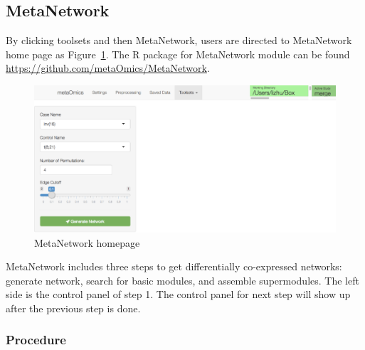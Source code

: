 \subsection{MetaNetwork}
By clicking toolsets and then MetaNetwork,
users are directed to MetaNetwork home page as Figure~\ref{fig:MetaNetworkHome}.
The R package for MetaNetwork module can be found \url{https://github.com/metaOmics/MetaNetwork}.

\begin{figure}[H]
\begin{center}
\includegraphics[scale=0.9]{./figure/MetaNetwork/MetaNetworkHome}
\caption{MetaNetwork homepage}
\label{fig:MetaNetworkHome}
\end{center}
\end{figure}

MetaNetwork includes three steps to get differentially co-expressed networks: generate network, search for basic modules, and assemble supermodules. The left side is the control panel of step 1. The control panel for next step will show up after the previous step is done.

\subsubsection{Procedure}


